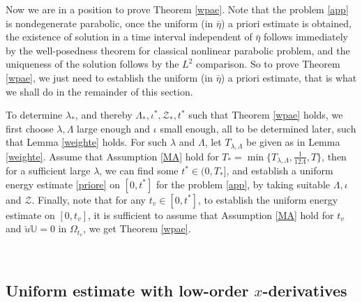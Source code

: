 \documentclass{amsart}
\numberwithin{equation}{section}
\begin{document}
Now we are in a position to prove Theorem \ref{wpae}. Note that the problem \eqref{app} is nondegenerate parabolic, once the uniform (in $\bar{\eta}$) a priori estimate is obtained, the existence of solution in a time interval independent of $\bar{\eta}$ follows immediately by the well-posedness theorem for classical nonlinear parabolic problem, and the uniqueness of the solution follows by the $L^{2}$ comparison. So to prove Theorem \ref{wpae}, we just need to establish the uniform (in $\bar{\eta}$) a priori estimate, that is what we shall do in the remainder of this section.

To determine $\lambda_{*}$, and thereby $\Lambda_{*},\iota^{*},\mathcal{Z}_{*},t^{*}$ such that Theorem \ref{wpae} holds, we first choose $\lambda,\Lambda$ large enough and $\iota$ small enough, all to be determined later, such that Lemma \ref{weighte} holds. For such $\lambda$ and $\Lambda$, let $T_{\lambda,\Lambda}$ be given as in Lemma \ref{weighte}. Assume that Assumption \ref{MA} hold for
$T_{*}=\min\{T_{\lambda,\Lambda},\frac{1}{12\Lambda},T\}$, then for a sufficient large $\lambda$, we can find some $t^{*}\in(0,T_{*}]$, and establish a uniform energy estimate \eqref{priore} on $[0,t^{*}]$ for the problem \eqref{app}, by taking suitable $\Lambda,\iota$ and $\mathcal{Z}$. Finally, note that for any $t_{v}\in[0,t^{*}]$, to establish the uniform energy estimate on $[0,t_{v}]$, it is sufficient to assume that Assumption \ref{MA} hold for $t_{v}$ and $\check{u}\mathbb{U}=0$ in $\Omega_{t_{v}}$, we get Theorem \ref{wpae}.


~~~~~~~~~~

\subsection{Uniform estimate with low-order $x$-derivatives}~
\end{document}
